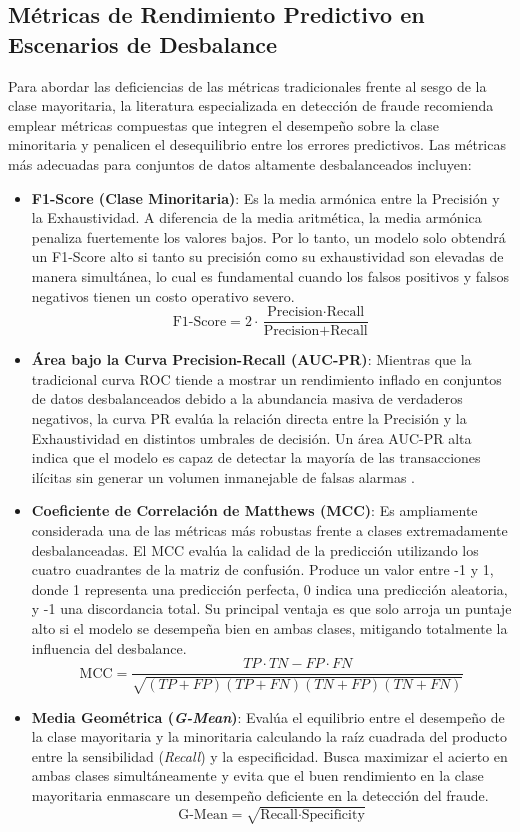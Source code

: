\subsection{Métricas de Rendimiento Predictivo en Escenarios de Desbalance}

Para abordar las deficiencias de las métricas tradicionales frente al sesgo de la clase mayoritaria, la literatura especializada en detección de fraude recomienda emplear métricas compuestas que integren el desempeño sobre la clase minoritaria y penalicen el desequilibrio entre los errores predictivos. Las métricas más adecuadas para conjuntos de datos altamente desbalanceados incluyen:

\begin{itemize}
    \item \textbf{F1-Score (Clase Minoritaria)}: Es la media armónica entre la Precisión y la Exhaustividad. A diferencia de la media aritmética, la media armónica penaliza fuertemente los valores bajos. Por lo tanto, un modelo solo obtendrá un F1-Score alto si tanto su precisión como su exhaustividad son elevadas de manera simultánea, lo cual es fundamental cuando los falsos positivos y falsos negativos tienen un costo operativo severo.
    \[ \text{F1-Score} = 2 \cdot \frac{\text{Precision} \cdot \text{Recall}}{\text{Precision} + \text{Recall}} \]
    
    \item \textbf{Área bajo la Curva Precision-Recall (AUC-PR)}: Mientras que la tradicional curva ROC tiende a mostrar un rendimiento inflado en conjuntos de datos desbalanceados debido a la abundancia masiva de verdaderos negativos, la curva PR evalúa la relación directa entre la Precisión y la Exhaustividad en distintos umbrales de decisión. Un área AUC-PR alta indica que el modelo es capaz de detectar la mayoría de las transacciones ilícitas sin generar un volumen inmanejable de falsas alarmas \cite{Unagar2025SurveyXAI}.
    
    \item \textbf{Coeficiente de Correlación de Matthews (MCC)}: Es ampliamente considerada una de las métricas más robustas frente a clases extremadamente desbalanceadas. El MCC evalúa la calidad de la predicción utilizando los cuatro cuadrantes de la matriz de confusión. Produce un valor entre -1 y 1, donde 1 representa una predicción perfecta, 0 indica una predicción aleatoria, y -1 una discordancia total. Su principal ventaja es que solo arroja un puntaje alto si el modelo se desempeña bien en ambas clases, mitigando totalmente la influencia del desbalance.
    \[ \text{MCC} = \frac{TP \cdot TN - FP \cdot FN}{\sqrt{(TP+FP)(TP+FN)(TN+FP)(TN+FN)}} \]
    
    \item \textbf{Media Geométrica (\textit{G-Mean})}: Evalúa el equilibrio entre el desempeño de la clase mayoritaria y la minoritaria calculando la raíz cuadrada del producto entre la sensibilidad (\textit{Recall}) y la especificidad. Busca maximizar el acierto en ambas clases simultáneamente y evita que el buen rendimiento en la clase mayoritaria enmascare un desempeño deficiente en la detección del fraude.
    \[ \text{G-Mean} = \sqrt{\text{Recall} \cdot \text{Specificity}} \]
\end{itemize}

